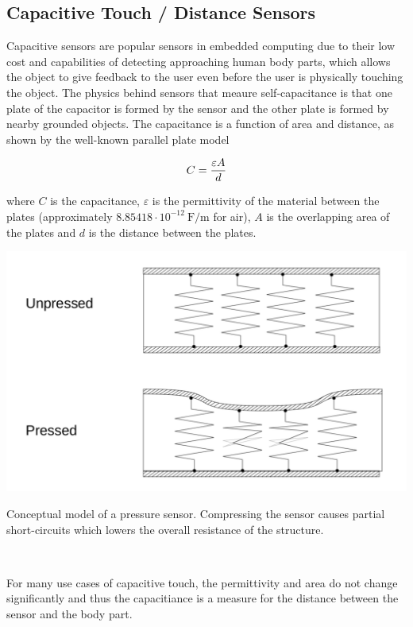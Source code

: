 \documentclass{sigchi-ext}
\begin{document}
\subsection{Capacitive Touch / Distance Sensors}
Capacitive sensors are popular sensors in embedded computing due to their low cost
and capabilities of detecting approaching human body parts, which allows the
object to give feedback to the user even before the user is physically touching
the object. The physics behind sensors that meaure self-capacitance is that one
plate of the capacitor is formed by the sensor and the other plate is formed by
nearby grounded objects. The capacitance is a function of area and distance, as
shown by the well-known parallel plate model

\begin{equation}
C = {{\varepsilon A} \over {d}}
\end{equation}

where $C$ is the capacitance, $\varepsilon$ is the permittivity of the material
between the plates (approximately $8.85418 \cdot 10^{-12} ~ \textrm{F/m}$ for
air), $A$ is the overlapping area of the plates and $d$ is the distance between
the plates.

\begin{marginfigure}
\begin{minipage}{\marginparwidth}
\centering
\includegraphics[width=0.9\columnwidth]{figures/resistive_sensor}
 \caption{Conceptual model of a pressure sensor. Compressing the sensor causes
  partial short-circuits which lowers the overall resistance of the
  structure.}~\label{fig:pressure_sensor}
\end{minipage}
\end{marginfigure}


For many use cases of capacitive touch, the permittivity and area do not change
significantly and thus the capacitiance is a measure for the distance between
the sensor and the body part.
\end{document}

